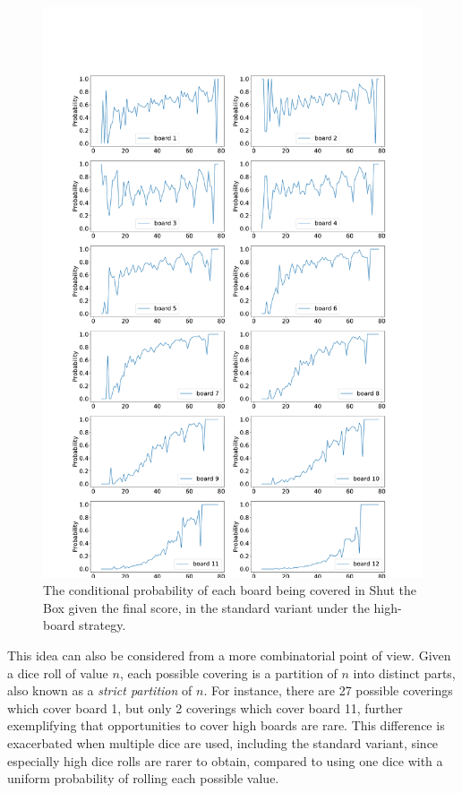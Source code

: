 \begin{figure}
    \centering
    \includegraphics[width=\textwidth]{images/ShutTheBox/stb12_2d6_score_given_board_12.pdf}
    \caption{The conditional probability of each board being covered in Shut the Box given the final score, in the standard variant under the high-board strategy.}
\label{cs1:stb12_2d6_cond_prob}
\end{figure}

This idea can also be considered from a more combinatorial point of view. Given a dice roll of value $n$, each possible covering is a partition of $n$ into distinct parts, also known as a \emph{strict partition} of $n$. For instance, there are 27 possible coverings which cover board 1, but only 2 coverings which cover board 11, further exemplifying that opportunities to cover high boards are rare. This difference is exacerbated when multiple dice are used, including the standard variant, since especially high dice rolls are rarer to obtain, compared to using one dice with a uniform probability of rolling each possible value.

